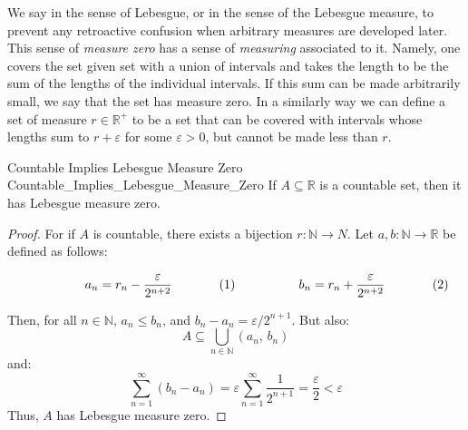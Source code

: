 \documentclass[crop=false,class=article]{standalone}                           %
\begin{document}
        We say in the sense of Lebesgue, or in the sense of the Lebesgue
        measure, to prevent any retroactive confusion when arbitrary measures
        are developed later. This sense of \textit{measure zero} has a sense
        of \textit{measuring} associated to it. Namely, one covers the set
        given set with a union of intervals and takes the length to be the
        sum of the lengths of the individual intervals. If this sum can be
        made arbitrarily small, we say that the set has measure zero. In a
        similarly way we can define a set of measure $r\in\mathbb{R}^{+}$ to
        be a set that can be covered with intervals whose lengths sum to
        $r+\varepsilon$ for some $\varepsilon>0$, but cannot be made less
        than $r$.
        \begin{ltheorem}{Countable Implies Lebesgue Measure Zero}
                        {Countable_Implies_Lebesgue_Measure_Zero}
            If $A\subseteq\mathbb{R}$ is a countable set, then it has
            Lebesgue measure zero.
        \end{ltheorem}
        \begin{proof}
            For if $A$ is countable, there exists a bijection
            $r:\mathbb{N}\rightarrow{N}$. Let
            $a,b:\mathbb{N}\rightarrow\mathbb{R}$ be defined as follows:
            \par
            \begin{subequations}
                \begin{minipage}[b]{0.49\textwidth}
                    \begin{equation}
                        a_{n}=r_{n}-\frac{\varepsilon}{2^{n+2}}
                    \end{equation}
                \end{minipage}
                \hfill
                \begin{minipage}[b]{0.49\textwidth}
                    \begin{equation}
                        b_{n}=r_{n}+\frac{\varepsilon}{2^{n+2}}
                    \end{equation}
                \end{minipage}
            \end{subequations}
            \par\vspace{2.5ex}
            Then, for all $n\in\mathbb{N}$, $a_{n}\leq{b}_{n}$, and
            $b_{n}-a_{n}=\varepsilon/2^{n+1}$. But also:
            \begin{equation}
                A\subseteq\bigcup_{n\in\mathbb{N}}(a_{n},\,b_{n})
            \end{equation}
            and:
            \begin{equation}
                \sum_{n=1}^{\infty}(b_{n}-a_{n})
                =\varepsilon\sum_{n=1}^{\infty}\frac{1}{2^{n+1}}
                =\frac{\varepsilon}{2}<\varepsilon
            \end{equation}
            Thus, $A$ has Lebesgue measure zero.
        \end{proof}
\end{document}
